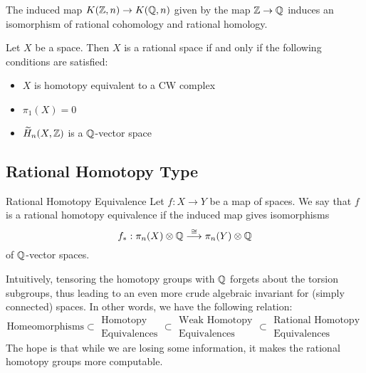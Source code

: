 \documentclass[a4paper]{article}
\begin{document}
\begin{crl}{}{} The induced map $K(\mathbb{Z},n)\to K(\mathbb{Q},n)$ given by the map $\mathbb{Z}\to\mathbb{Q}$ induces an isomorphism of rational cohomology and rational homology. 
\end{crl}

\begin{thm}{}{} Let $X$ be a space. Then $X$ is a rational space if and only if the following conditions are satisfied: 
\begin{itemize}
\item $X$ is homotopy equivalent to a CW complex
\item $\pi_1(X)=0$
\item $\widetilde{H}_n(X,\mathbb{Z})$ is a $\mathbb{Q}$-vector space
\end{itemize}
\end{thm}

\subsection{Rational Homotopy Type}
\begin{defn}{Rational Homotopy Equivalence}{} Let $f:X\to Y$ be a map of spaces. We say that $f$ is a rational homotopy equivalence if the induced map gives isomorphisms $$f_\ast:\pi_n(X)\otimes\mathbb{Q}\overset{\cong}{\longrightarrow}\pi_n(Y)\otimes\mathbb{Q}$$ of $\mathbb{Q}$-vector spaces. 
\end{defn}

Intuitively, tensoring the homotopy groups with $\mathbb{Q}$ forgets about the torsion subgroups, thus leading to an even more crude algebraic invariant for (simply connected) spaces. In other words, we have the following relation: $$\text{Homeomorphisms}\subset\substack{\text{Homotopy}\\\text{Equivalences}}\subset\substack{\text{Weak Homotopy}\\\text{Equivalences}}\subset\substack{\text{Rational Homotopy}\\\text{Equivalences}}$$ The hope is that while we are losing some information, it makes the rational homotopy groups more computable. 
\end{document}
